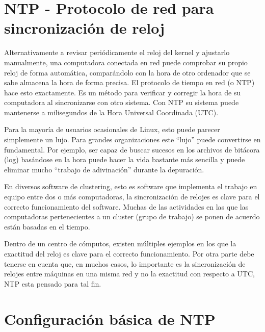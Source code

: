 \documentclass[12pt]{article}
\begin{document}
\section*{NTP - Protocolo de red para sincronización de reloj}

Alternativamente a revisar periódicamente el reloj del kernel y ajustarlo 
manualmente, una computadora conectada en red puede 
comprobar su propio reloj de forma automática, comparándolo con la hora
de otro ordenador que se sabe almacena la hora de forma precisa. El 
protocolo de tiempo en red (o NTP) hace esto exactamente. Es un método para 
verificar y corregir la hora de su computadora al sincronizarse con otro 
sistema. Con NTP su sistema puede mantenerse a milisegundos de la Hora 
Universal Coordinada (UTC). 
	
Para la mayoría de usuarios ocasionales de Linux, esto puede parecer
simplemente un lujo.  Para grandes organizaciones 
este ``lujo'' puede convertirse en fundamental. Por ejemplo, ser capaz de 
buscar sucesos en los archivos de bitácora (log) basándose en la hora puede hacer la vida 
bastante más sencilla y puede eliminar mucho ``trabajo de adivinación'' 
durante la depuración.

En diversos software de clustering, esto es software que implementa el trabajo 
en equipo entre dos o más computadoras, la sincronización de relojes es 
clave para el correcto funcionamiento del software. Muchas de las actividades 
en las que las computadoras pertenecientes a un cluster (grupo de trabajo)
se ponen de acuerdo están basadas en el tiempo.

Dentro de un centro de cómputos, existen múltiples ejemplos en los que la 
exactitud del reloj es clave para el correcto funcionamiento. Por otra parte
debe tenerse en cuenta que, en muchos casos, lo importante es la sincronización de 
relojes entre máquinas en una misma red y no la exactitud con respecto a UTC, NTP 
esta pensado para tal fin.   




\section*{ Configuración básica de NTP}
\end{document}
